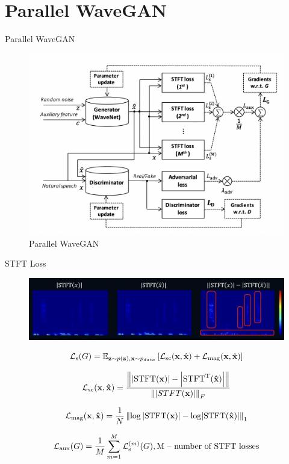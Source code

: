 \section{Parallel WaveGAN}
\begin{frame}{Parallel WaveGAN}
    \begin{figure}
    	\centering
    	\includegraphics[width=0.7\linewidth]{figs/par_wavegan.png}
    	\caption{Parallel WaveGAN}
    \end{figure}


\end{frame}
\begin{frame}{STFT Loss}
    \begin{figure}
    	\centering
    	\includegraphics[width=0.7\linewidth]{figs/stft.png}
    \end{figure}
    
    $${\cal{L}}_{\mathrm{s}}(G)=\mathbb{E}_{\mathbf{z}\sim p(\mathbf{z}),\mathbf{x}\sim p_{data}}\left[\cal L_{\mathrm{sc}}(\mathbf{x},{\mathbf{\hat{x}}})+\cal{L}_{\mathrm{mag}}(\mathbf{x},{\mathbf{\hat{x}}})\right]$$
    
    $${\cal{L}}_{\mathrm{sc}}(\mathbf{x},\mathbf{\hat{x}})=\frac{\left\Vert \left|\mathrm{STFT}(\mathbf{x})\right|-\left|\mathrm{STFT}^{\mathrm{T}}(\mathbf{\hat{x}})\right|\right\Vert}{\left\Vert \left|{STFT}(\mathbf{x})\right|\right\Vert_F}$$
    
    $${\cal L}_{\mathrm{mag}}(\mathbf{x},\mathbf{\hat{x}})={\frac{1}{N}}\left\Vert\log\left|\mathrm{STFT}(\mathbf{x})\right|-\log\!\left|\mathrm{STFT}(\mathbf{\hat{x}})\right| \right\Vert_1$$
    
    $${\cal L}_{\mathrm{aux}}(G)={\frac{1}{M}}\sum_{m=1}^{M}{\cal L}_{\mathrm{s}}^{(m)}(G), \text{M -- number of STFT losses}$$
    

\end{frame}
